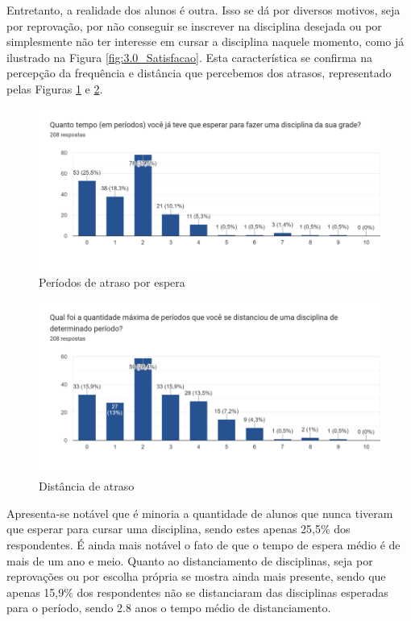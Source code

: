         Entretanto, a realidade dos alunos é outra. Isso se dá por diversos motivos, seja por reprovação, por não conseguir se inscrever na disciplina desejada ou por simplesmente não ter interesse em cursar a disciplina naquele momento, como já ilustrado na Figura \ref{fig:3.0_Satisfacao}. Esta característica se confirma na percepção da frequência e distância que percebemos dos atrasos, representado pelas Figuras \ref{fig:5.1-Atrasos-Esperar} e \ref{fig:5.2-Atrasos-Distancia}.

        \begin{figure}[htbp]\centering
            \caption{\label{fig:5.1-Atrasos-Esperar}Períodos de atraso por espera}
            \includegraphics[scale=0.6]{files/img/Forms/5.1-Atrasos-Esperar.png}
        \end{figure} %
        \begin{figure}[htbp]\centering
            \caption{\label{fig:5.2-Atrasos-Distancia}Distância de atraso}
            \includegraphics[scale=0.6]{files/img/Forms/5.2-Atrasos-Distancia.png}
        \end{figure} %
        Apresenta-se notável que é minoria a quantidade de alunos que nunca tiveram que esperar para cursar uma disciplina, sendo estes apenas 25,5\% dos respondentes. É ainda mais notável o fato de que o tempo de espera médio é de mais de um ano e meio. Quanto ao distanciamento de disciplinas, seja por reprovações ou por escolha própria se mostra ainda mais presente, sendo que apenas 15,9\% dos respondentes não se distanciaram das disciplinas esperadas para o período, sendo 2.8 anos o tempo médio de distanciamento.


